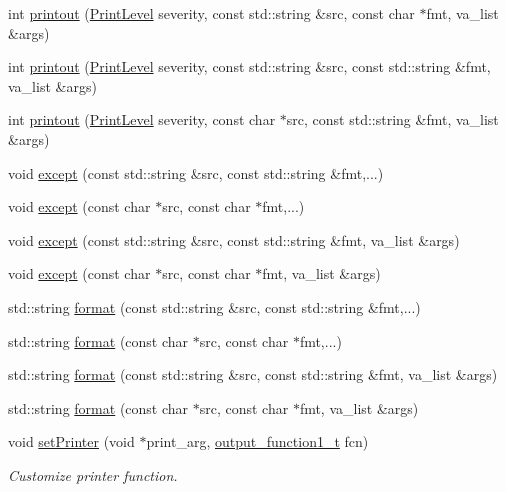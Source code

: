 \begin{DoxyCompactItemize}
\item 
int \hyperlink{namespace_d_d4hep_a3c8456e0ca02e7299e7bcd0480316eaa}{printout} (\hyperlink{namespace_d_d4hep_a5b5a64d56252469451f2020a27d57d42}{PrintLevel} severity, const std::string \&src, const char $\ast$fmt, va\_\-list \&args)
\item 
int \hyperlink{namespace_d_d4hep_a7cb4c929065e6f4c054748cfcdc90f9c}{printout} (\hyperlink{namespace_d_d4hep_a5b5a64d56252469451f2020a27d57d42}{PrintLevel} severity, const std::string \&src, const std::string \&fmt, va\_\-list \&args)
\item 
int \hyperlink{namespace_d_d4hep_a1ad7a8f6ac790c5d06c8dc2e2c9bf656}{printout} (\hyperlink{namespace_d_d4hep_a5b5a64d56252469451f2020a27d57d42}{PrintLevel} severity, const char $\ast$src, const std::string \&fmt, va\_\-list \&args)
\item 
void \hyperlink{namespace_d_d4hep_af8602b0b80e0c252cf28e5fbbc81abcc}{except} (const std::string \&src, const std::string \&fmt,...)
\item 
void \hyperlink{namespace_d_d4hep_a7fe7772a289c1e2eb3587ea99900827b}{except} (const char $\ast$src, const char $\ast$fmt,...)
\item 
void \hyperlink{namespace_d_d4hep_a4a02ec0c7a458f972986c141672a044c}{except} (const std::string \&src, const std::string \&fmt, va\_\-list \&args)
\item 
void \hyperlink{namespace_d_d4hep_a0ecfb76ddfb873affe80600e3d8912dd}{except} (const char $\ast$src, const char $\ast$fmt, va\_\-list \&args)
\item 
std::string \hyperlink{namespace_d_d4hep_a9a97cc57d7225177b869138f63751ffc}{format} (const std::string \&src, const std::string \&fmt,...)
\item 
std::string \hyperlink{namespace_d_d4hep_a6d0802d60cd32a48326f689ffedd4dfb}{format} (const char $\ast$src, const char $\ast$fmt,...)
\item 
std::string \hyperlink{namespace_d_d4hep_a960e10fa425f33d67d2963b22f76f24a}{format} (const std::string \&src, const std::string \&fmt, va\_\-list \&args)
\item 
std::string \hyperlink{namespace_d_d4hep_a2d9fc6b33e6b8890a8974aa6ccee4b1c}{format} (const char $\ast$src, const char $\ast$fmt, va\_\-list \&args)
\item 
void \hyperlink{namespace_d_d4hep_a598efc9dd592c6ab1dd96be38bf5f9f8}{setPrinter} (void $\ast$print\_\-arg, \hyperlink{namespace_d_d4hep_ae75e3a861e057274d7f7bb67011ff3b4}{output\_\-function1\_\-t} fcn)
\begin{DoxyCompactList}\small\item\em Customize printer function. \item\end{DoxyCompactList}\item 

\end{DoxyCompactItemize}
